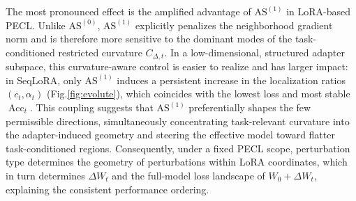 \documentclass{article}
\theoremstyle{plain}
\theoremstyle{definition}
\theoremstyle{remark}
\begin{document}


The most pronounced effect is the amplified advantage of $\mathrm{AS}^{(1)}$ in LoRA-based PECL. Unlike $\mathrm{AS}^{(0)}$, $\mathrm{AS}^{(1)}$ explicitly penalizes the neighborhood gradient norm and is therefore more sensitive to the dominant modes of the task-conditioned restricted curvature $C_{\Delta,t}$. In a low-dimensional, structured adapter subspace, this curvature-aware control is easier to realize and has larger impact: in SeqLoRA, only $\mathrm{AS}^{(1)}$ induces a persistent increase in the localization ratios $(c_t,\alpha_t)$ (Fig.\ref{fig:evolute}), which coincides with the lowest loss and most stable $\operatorname{Acc}_t$. This coupling suggests that $\mathrm{AS}^{(1)}$ preferentially shapes the few permissible directions, simultaneously concentrating task-relevant curvature into the adapter-induced geometry and steering the effective model toward flatter task-conditioned regions. Consequently, under a fixed PECL scope, perturbation type determines the geometry of perturbations within LoRA coordinates, which in turn determines $\Delta W_t$ and the full-model loss landscape of $W_0+\Delta W_t$, explaining the consistent performance ordering.
\end{document}
